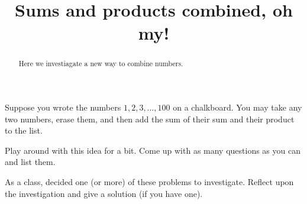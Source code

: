 \documentclass[nooutcomes]{ximera}
\title{Sums and products combined, oh my!}
\begin{document}
\begin{abstract}
Here we investiagate a new way to combine numbers.
\end{abstract}
\maketitle

Suppose you wrote the numbers $1,2,3,\dots,100$ on a chalkboard. You
may take any two numbers, erase them, and then add the sum of their
sum and their product to the list.


\begin{problem}
Play around with this idea for a bit. Come up with as many questions
as you can and list them.
\begin{freeResponse}
\end{freeResponse}
\end{problem}

\begin{problem}
As a class, decided one (or more) of these problems to
investigate. Reflect upon the investigation and give a solution (if
you have one).
\begin{freeResponse}
\end{freeResponse}
\end{problem}
\end{document}
